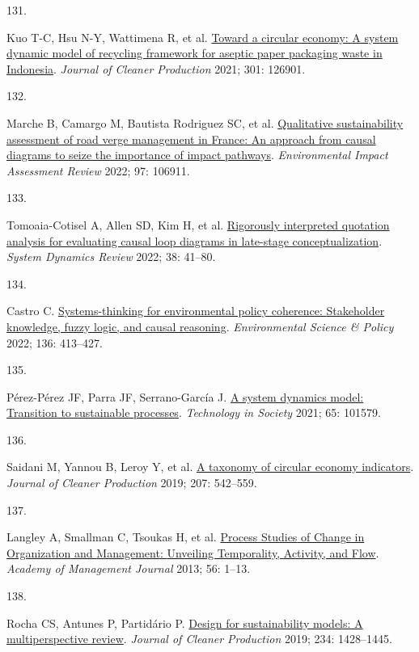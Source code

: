 \documentclass[
  12pt,
  a4paperpaper,
  onecolumn]{article}
\newlength{\cslhangindent}
\newlength{\csllabelwidth}
\newlength{\cslentryspacingunit} %
\newenvironment{CSLReferences}[2] %
 {%
  \setlength{\parindent}{0pt}
  \ifodd #1
  \let\oldpar\par
  \def\par{\hangindent=\cslhangindent\oldpar}
  \fi
  \setlength{\parskip}{#2\cslentryspacingunit}
 }%
 {}
\newcommand{\CSLLeftMargin}[1]{\parbox[t]{\csllabelwidth}{#1}}
\newcommand{\CSLRightInline}[1]{\parbox[t]{\linewidth - \csllabelwidth}{#1}\break}
\begin{document}
\begin{CSLReferences}{0}{0}
\leavevmode{}%
\CSLLeftMargin{131. }%
\CSLRightInline{Kuo T-C, Hsu N-Y, Wattimena R, et al.
\href{https://doi.org/10.1016/j.jclepro.2021.126901}{Toward a circular
economy: {A} system dynamic model of recycling framework for aseptic
paper packaging waste in {Indonesia}}. \emph{Journal of Cleaner
Production} 2021; 301: 126901.}

\leavevmode{}%
\CSLLeftMargin{132. }%
\CSLRightInline{Marche B, Camargo M, Bautista Rodriguez SC, et al.
\href{https://doi.org/10.1016/j.eiar.2022.106911}{Qualitative
sustainability assessment of road verge management in {France}: {An}
approach from causal diagrams to seize the importance of impact
pathways}. \emph{Environmental Impact Assessment Review} 2022; 97:
106911.}

\leavevmode{}%
\CSLLeftMargin{133. }%
\CSLRightInline{Tomoaia-Cotisel A, Allen SD, Kim H, et al.
\href{https://doi.org/10.1002/SDR.1701}{Rigorously interpreted quotation
analysis for evaluating causal loop diagrams in late-stage
conceptualization}. \emph{System Dynamics Review} 2022; 38: 41--80.}

\leavevmode{}%
\CSLLeftMargin{134. }%
\CSLRightInline{Castro C.
\href{https://doi.org/10.1016/j.envsci.2022.07.001}{Systems-thinking for
environmental policy coherence: {Stakeholder} knowledge, fuzzy logic,
and causal reasoning}. \emph{Environmental Science \& Policy} 2022; 136:
413--427.}

\leavevmode{}%
\CSLLeftMargin{135. }%
\CSLRightInline{Pérez-Pérez JF, Parra JF, Serrano-García J.
\href{https://doi.org/10.1016/j.techsoc.2021.101579}{A system dynamics
model: {Transition} to sustainable processes}. \emph{Technology in
Society} 2021; 65: 101579.}

\leavevmode{}%
\CSLLeftMargin{136. }%
\CSLRightInline{Saidani M, Yannou B, Leroy Y, et al.
\href{https://doi.org/10.1016/j.jclepro.2018.10.014}{A taxonomy of
circular economy indicators}. \emph{Journal of Cleaner Production} 2019;
207: 542--559.}

\leavevmode{}%
\CSLLeftMargin{137. }%
\CSLRightInline{Langley A, Smallman C, Tsoukas H, et al.
\href{https://doi.org/10.5465/amj.2013.4001}{Process {Studies} of
{Change} in {Organization} and {Management}: {Unveiling Temporality},
{Activity}, and {Flow}}. \emph{Academy of Management Journal} 2013; 56:
1--13.}

\leavevmode{}%
\CSLLeftMargin{138. }%
\CSLRightInline{Rocha CS, Antunes P, Partidário P.
\href{https://doi.org/10.1016/j.jclepro.2019.06.108}{Design for
sustainability models: {A} multiperspective review}. \emph{Journal of
Cleaner Production} 2019; 234: 1428--1445.}

\end{CSLReferences}
\end{document}
